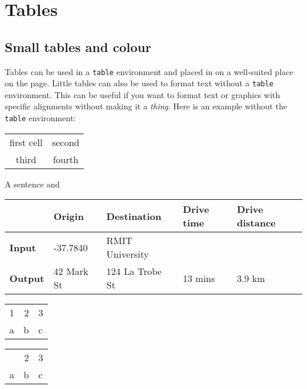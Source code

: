 \chapter{Tables} \label{tables}


\section{Small tables and colour}
Tables can be used in a \texttt{table} environment and placed in on a well-suited place on the page. Little tables can also be used to format text without a \texttt{table} environment. This can be useful if you want to format text or graphics with specific alignments without making it a \textit{thing}. Here is an example without the \texttt{table} environment:
    
    
    \begin{tabular}{cc}
        first cell  & second  \\
        third       & fourth
    \end{tabular}
    
    A sentence and \textbf{}

    
    
    \begin{tabular}{lllll} %
    \toprule %
        & Origin & Destination & Drive time & Drive distance \\
    \toprule %
        \textbf{Input} & -37.7840 & RMIT University & & \\
    \midrule
        \textbf{Output} & 42 Mark St & 124 La Trobe St & 13 mins & 3.9 km \\
    \bottomrule
\end{tabular}

\begin{tabular}{p{10cm}ll}
\multicolumn{1}{r}{1} & \multicolumn{1}{r}{2} & \multicolumn{1}{r}{3} \\
a     & b     & c \\
\end{tabular}%

\begin{tabular}{lll}
\rowcolor[rgb]{ .388,  .745,  .482} \multicolumn{1}{r}{1} & \multicolumn{1}{r}{\cellcolor[rgb]{ 1,  .922,  .518}2} & \multicolumn{1}{r}{\cellcolor[rgb]{ .973,  .412,  .42}3} \\
a     & b     & c \\
\end{tabular}%




